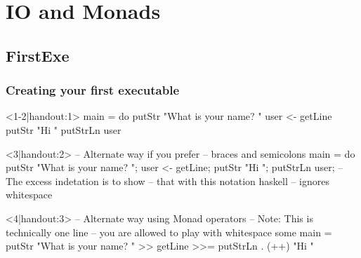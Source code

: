 \section{IO and Monads}
\subsection{FirstExe}
\begin{frame}[t,fragile]
    \frametitle{Creating your first executable}
    \begin{overprint}
        \begin{hscode}<1-2|handout:1>
            main = do
              putStr "What is your name? "
              user <- getLine
              putStr "Hi "
              putStrLn user
        \end{hscode}

        \begin{onlyenv}<2|handout:1>
            To Run: \\
            \begin{verbatim}runhaskell <yourfile>\end{verbatim}}
            Or: \\
            \begin{verbatim}ghc <yourfile> -o <exename>; ./<exename>\end{verbatim}
        \end{onlyenv}

        \begin{hscode}<3|handout:2>
            -- Alternate way if you prefer 
            --   braces and semicolons
            main = do {
              putStr "What is your name? ";
                user <- getLine;
                  putStr "Hi ";
                    putStrLn user;
            }
            -- The excess indetation is to show
            --   that with this notation haskell
            --   ignores whitespace
        \end{hscode}

        \begin{hscode}<4|handout:3>
            -- Alternate way using Monad operators
            -- Note: This is technically one line
            --   you are allowed to play with whitespace some
            main = putStr "What is your name? " >>
                   getLine >>=
                   putStrLn . (++) "Hi "
        \end{hscode}
    \end{overprint}
\end{frame}


